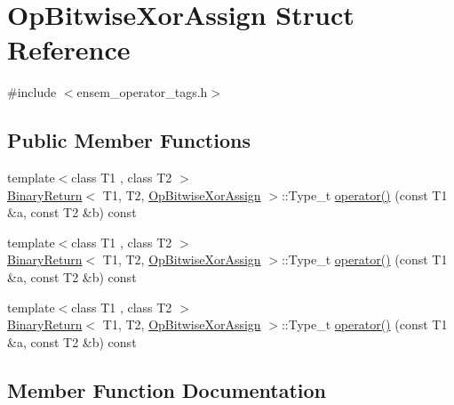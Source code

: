 \hypertarget{structOpBitwiseXorAssign}{}\section{Op\+Bitwise\+Xor\+Assign Struct Reference}
\label{structOpBitwiseXorAssign}


{\ttfamily \#include $<$ensem\+\_\+operator\+\_\+tags.\+h$>$}

\subsection*{Public Member Functions}
\begin{DoxyCompactItemize}
\item 
{\footnotesize template$<$class T1 , class T2 $>$ }\\\mbox{\hyperlink{structBinaryReturn}{Binary\+Return}}$<$ T1, T2, \mbox{\hyperlink{structOpBitwiseXorAssign}{Op\+Bitwise\+Xor\+Assign}} $>$\+::Type\+\_\+t \mbox{\hyperlink{structOpBitwiseXorAssign_a09ad5519029abdca1ad159742ed8ed89}{operator()}} (const T1 \&a, const T2 \&b) const
\item 
{\footnotesize template$<$class T1 , class T2 $>$ }\\\mbox{\hyperlink{structBinaryReturn}{Binary\+Return}}$<$ T1, T2, \mbox{\hyperlink{structOpBitwiseXorAssign}{Op\+Bitwise\+Xor\+Assign}} $>$\+::Type\+\_\+t \mbox{\hyperlink{structOpBitwiseXorAssign_a09ad5519029abdca1ad159742ed8ed89}{operator()}} (const T1 \&a, const T2 \&b) const
\item 
{\footnotesize template$<$class T1 , class T2 $>$ }\\\mbox{\hyperlink{structBinaryReturn}{Binary\+Return}}$<$ T1, T2, \mbox{\hyperlink{structOpBitwiseXorAssign}{Op\+Bitwise\+Xor\+Assign}} $>$\+::Type\+\_\+t \mbox{\hyperlink{structOpBitwiseXorAssign_a09ad5519029abdca1ad159742ed8ed89}{operator()}} (const T1 \&a, const T2 \&b) const
\end{DoxyCompactItemize}


\subsection{Member Function Documentation}
\mbox{\label{structOpBitwiseXorAssign_a09ad5519029abdca1ad159742ed8ed89}} 

